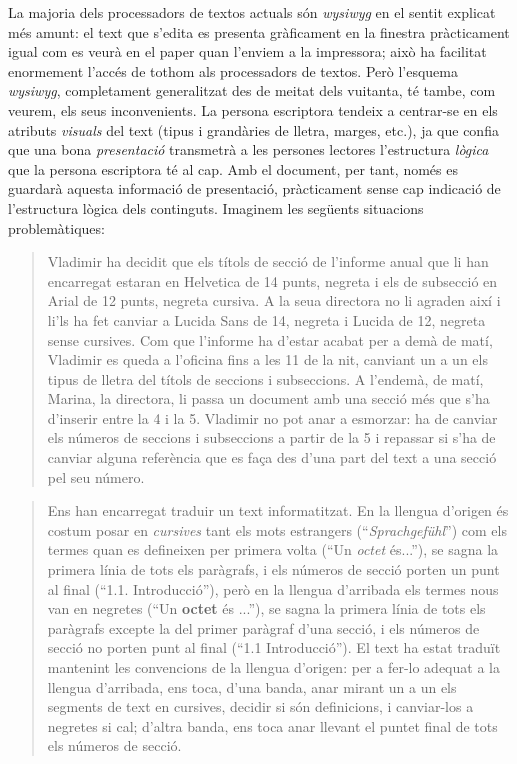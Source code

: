 La majoria dels processadors de textos actuals són \emph{wysiwyg} en
el sentit explicat més amunt: el text que s'edita es presenta
gràficament en la finestra pràcticament igual com es veurà en el paper
quan l'enviem a la impressora; això ha facilitat enormement l'accés
de tothom als processadors de textos. Però l'esquema \emph{wysiwyg},
completament generalitzat des de meitat dels vuitanta, té tambe, com
veurem, els seus inconvenients.  La persona escriptora tendeix a
centrar-se en els atributs \emph{visuals} del text (tipus i grandàries
de lletra, marges, etc.), ja que confia que una bona
\emph{presentació} transmetrà a les persones lectores l'estructura
\emph{lògica} que la persona escriptora té al cap.  Amb el
document, per tant, només es guardarà aquesta informació de
presentació, pràcticament sense cap indicació de l'estructura lògica
dels continguts. Imaginem les següents situacions problemàtiques:
  \begin{quote}
      Vladimir ha decidit que els títols de secció de l'informe anual
      que li han encarregat estaran en Helvetica de 14 punts, negreta
      i els de subsecció en Arial de 12 punts, negreta cursiva. A la
      seua directora no li agraden així i li'ls ha fet canviar a
      Lucida Sans de 14, negreta i Lucida de 12, negreta sense
      cursives. Com que l'informe ha d'estar acabat per a demà de
      matí, Vladimir es queda a l'oficina fins a les 11 de la nit,
      canviant un a un els tipus de lletra del títols de seccions i
      subseccions. A l'endemà, de matí, Marina, la directora, li passa
      un document amb una secció més que s'ha d'inserir entre la 4 i
      la 5. Vladimir no pot anar a esmorzar: ha de canviar els números
      de seccions i subseccions a partir de la 5 i repassar si s'ha de
      canviar alguna referència que es faça des d'una part del text a
      una secció pel seu número.
  \end{quote}

  \begin{quote}
    Ens han encarregat traduir un text informatitzat. En la llengua
    d'origen és costum posar en \emph{cursives} tant els mots
    estrangers (``\emph{Sprachgefühl}'') com els termes quan es
    defineixen per primera volta (``Un \emph{octet} és...''), se sagna
    la primera línia de tots els paràgrafs, i els números de secció
    porten un punt al final (``1.1. Introducció''), però en la llengua
    d'arribada els termes nous van en negretes (``Un \textbf{octet} és
    ...''), se sagna la primera línia de tots els paràgrafs excepte la
    del primer paràgraf d'una secció, i els números de secció no
    porten punt al final (``1.1 Introducció''). El text ha estat
    traduït mantenint les convencions de la llengua d'origen: per a
    fer-lo adequat a la llengua d'arribada, ens toca, d'una banda,
    anar mirant un a un els segments de text en cursives, decidir si
    són definicions, i canviar-los a negretes si cal; d'altra banda,
    ens toca anar llevant el puntet final de tots els números de
    secció.
  \end{quote}
  

